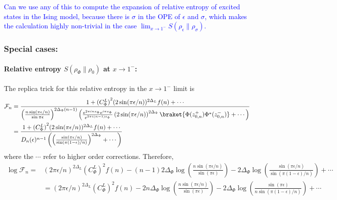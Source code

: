 \documentclass[11pt]{article}
\newcommand{\ep}{\epsilon}
\newcommand{\nn}{\nonumber}
\newcommand{\lb}{\left(}
\newcommand{\rb}{\right)}
\newcommand{\NL}[1]{\textcolor{blue}{#1}}
\begin{document}
\NL{Can we use any of this to compute the expansion of relative entropy of excited states in the Ising model, because there is $\sigma$ in the OPE of $\epsilon$ and $\sigma$, which makes the calculation highly non-trivial in the case $\lim_{x\to 1^-}S(\rho_\epsilon\|\rho_\sigma)$.}

\subsubsection{Special cases:}
\paragraph{Relative entropy $S(\rho_\Phi\|\rho_0)$ at $x\to 1^-$:}
The replica trick for this relative entropy in the $x\to 1^-$ limit is
\begin{align}
  \mathcal{F}_n&=\frac{1+{(C_\Phi^L)}^2(2\sin(\pi \ep/n))^{2\Delta_L}f(n)+\cdots }{\lb \frac{n \sin (\pi \ep /n)}{\sin \pi \ep} \rb^{2\Delta_\Phi (n-1)}\lb \frac{e^{2\pi i ns_\Phi}e^{i\pi s_\Phi}}{e^{2\pi i (n-1)s_\Phi}}
  \lb2\sin(\pi \ep/n)\rb^{2\Delta_\Phi}\braket{\Phi(z_{0,n}^+)\Phi^*(z_{0,n}^-)}+\cdots\rb } \nn \\
  &= \frac{1+{(C_\Phi^L)}^2(2\sin(\pi \ep/n))^{2\Delta_L}f(n)+\cdots }{D_n(\ep)^{n-1}\lb  \lb \frac{\sin(\pi \ep/n)}{\sin(\pi (1-\ep)/n)}\rb^{2\Delta_\Phi}+\cdots\rb 
  }
\end{align}
where the $\cdots$ refer to higher order corrections. 
Therefore,
\begin{align}
  \log\mathcal{F}_n=&(2\pi \ep/n)^{2\Delta_L}{(C_\Phi^L)}^2 f(n)-(n-1) 2\Delta_\Phi \log \lb \frac{n \sin (\pi \ep/n )}{\sin (\pi \ep)} \rb -2\Delta_\Phi\log\lb\frac{\sin(\pi \ep/n)}{\sin(\pi (1-\ep)/n)}\rb+\cdots\nn\\
  &=(2\pi \ep/n)^{2\Delta_L}{(C_\Phi^L)}^2 f(n)- 2n\Delta_\Phi \log \lb \frac{n \sin (\pi \ep/n )}{\sin (\pi \ep)} \rb -2\Delta_\Phi\log\lb\frac{\sin(\pi \ep)}{n\sin(\pi (1-\ep)/n)}\rb+\cdots
    \end{align}
\end{document}
